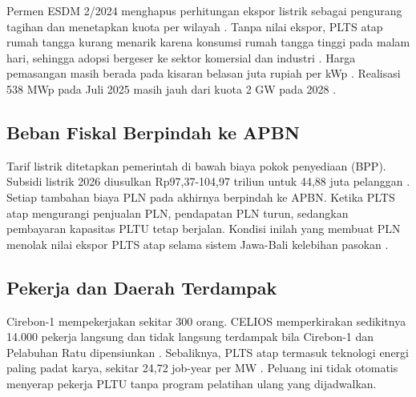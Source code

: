 Permen ESDM 2/2024 menghapus perhitungan ekspor listrik sebagai pengurang tagihan dan menetapkan kuota per wilayah \cite{R-PERMEN-ESDM-2-2024}. Tanpa nilai ekspor, PLTS atap rumah tangga kurang menarik karena konsumsi rumah tangga tinggi pada malam hari, sehingga adopsi bergeser ke sektor komersial dan industri \cite{P-IESR-PERMEN2,B-PVMAG-QUOTA}. Harga pemasangan masih berada pada kisaran belasan juta rupiah per kWp \cite{B-DETIK-HARGA-PLTS}. Realisasi 538 MWp pada Juli 2025 masih jauh dari kuota 2 GW pada 2028 \cite{B-KONTAN-ROOFTOP-2025,B-CNBC-ROOFTOP-2028}.

\subsection{Beban Fiskal Berpindah ke APBN}

Tarif listrik ditetapkan pemerintah di bawah biaya pokok penyediaan (BPP). Subsidi listrik 2026 diusulkan Rp97,37-104,97 triliun untuk 44,88 juta pelanggan \cite{B-KONTAN-SUBSIDI-2026}. Setiap tambahan biaya PLN pada akhirnya berpindah ke APBN. Ketika PLTS atap mengurangi penjualan PLN, pendapatan PLN turun, sedangkan pembayaran kapasitas PLTU tetap berjalan. Kondisi inilah yang membuat PLN menolak nilai ekspor PLTS atap selama sistem Jawa-Bali kelebihan pasokan \cite{B-TENGGARA-2024}.

\subsection{Pekerja dan Daerah Terdampak}

Cirebon-1 mempekerjakan sekitar 300 orang. CELIOS memperkirakan sedikitnya 14.000 pekerja langsung dan tidak langsung terdampak bila Cirebon-1 dan Pelabuhan Ratu dipensiunkan \cite{B-ECOBUSINESS-CIREBON}. Sebaliknya, PLTS atap termasuk teknologi energi paling padat karya, sekitar 24,72 job-year per MW \cite{P-CEEW-2017}. Peluang ini tidak otomatis menyerap pekerja PLTU tanpa program pelatihan ulang yang dijadwalkan.
